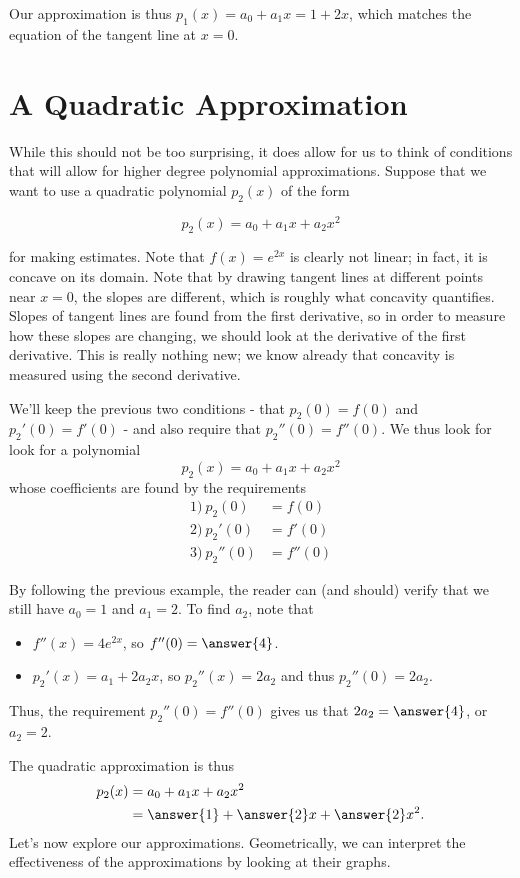 \documentclass{ximera}
\begin{document}
Our approximation is thus $p_1(x) = a_0+a_1x = 1+2x$, which matches the equation of the tangent line at $x=0$.

\section{A Quadratic Approximation}

While this should not be too surprising, it does allow for us to think of conditions that will allow for higher degree polynomial approximations.  Suppose that we want to use a quadratic polynomial $p_2(x)$ of the form

\[
p_2(x) = a_0+a_1x+a_2x^2
\]

for making estimates.  Note that $f(x)=e^{2x}$ is clearly not linear; in fact, it is concave  on its domain.  Note that by drawing tangent lines at different points near $x=0$, the slopes are different, which is roughly what concavity quantifies.  Slopes of tangent lines are found from the first derivative, so in order to measure how these slopes are changing, we should look at the derivative of the first derivative.  This is really nothing new; we know already that concavity is measured using the second derivative.

We'll keep the previous two conditions - that $p_2(0) = f(0)$ and $p_2'(0) = f'(0)$ - and also require that $p_2''(0) = f''(0)$.  We thus look for look for a polynomial
\[p_2(x) = a_0+a_1x+a_2x^2
\]
whose coefficients are found by the requirements
\begin{align*}
1) ~ p_2(0) & = f(0) \\
2) ~ p_2'(0) & = f'(0) \\
3) ~ p_2''(0) & = f''(0)
\end{align*}

By following the previous example, the reader can (and should) verify that we still have $a_0=1$ and $a_1=2$.  To find $a_2$, note that

\begin{itemize}
\item $f''(x) = 4e^{2x}$, so $f''(0) = \answer{4}$.
\item $p_2'(x) = a_1+2a_2x$, so $p_2''(x) = 2a_2$ and thus $p_2''(0) = 2 a_2$.
\end{itemize}
Thus, the requirement $p_2''(0) =f''(0)$ gives us that $2a_2=\answer{4}$, or $a_2=2$.

The quadratic approximation is thus 
\begin{align*}
p_2(x) &= a_0+a_1x+a_2x^2 \\
&= \answer{1}+\answer{2}x+\answer{2}x^2.
\end{align*}
Let's now explore our approximations.  Geometrically, we can interpret the effectiveness of the approximations by looking at their graphs.
\end{document}
